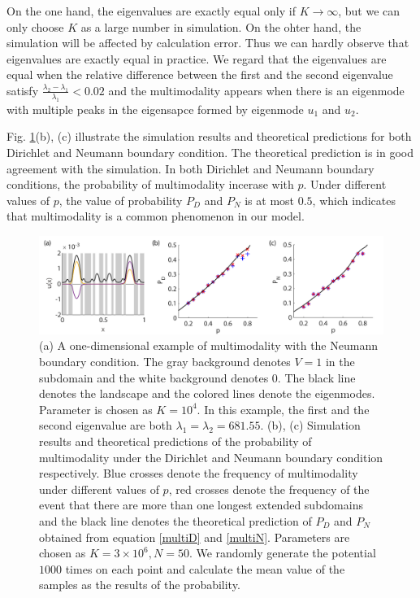 \documentclass[a4paper,11pt]{article}
\begin{document}
On the one hand, the eigenvalues are exactly equal only if $K \rightarrow \infty$, but we can only choose $K$ as a large number in simulation. On the ohter hand, the simulation will be affected by calculation error. Thus we can hardly observe that eigenvalues are exactly equal in practice. We regard that the eigenvalues are equal when the relative difference between the first and the second eigenvalue satisfy $\frac{\lambda_2 - \lambda_1}{\lambda_1} < 0.02$ and the multimodality appears when there is an eigenmode with multiple peaks in the eigensapce formed by eigenmode $u_1$ and $u_2$.

Fig. \ref{fig4}(b), (c) illustrate the simulation results and theoretical predictions for both Dirichlet and Neumann boundary condition. The theoretical prediction is in good agreement with the simulation. In both Dirichlet and Neumann boundary conditions, the probability of multimodality incerase with $p$. Under different values of $p$, the value of probability $P_D$ and $P_N$ is at most $0.5$, which indicates that multimodality is a common phenomenon in our model.

\begin{figure}
\centering
\includegraphics[width=\linewidth]{Fig4}
\caption{(a) A one-dimensional example of multimodality with the Neumann boundary condition. The gray background denotes $V = 1$ in the subdomain and the white background denotes $0$. The black line denotes the landscape and the colored lines denote the eigenmodes.  Parameter is chosen as $K = 10^4$. In this example, the first and the second eigenvalue are both $\lambda_1 = \lambda_2 = 681.55$. (b), (c) Simulation results and theoretical predictions of the probability of multimodality under the Dirichlet and Neumann boundary condition respectively. Blue crosses denote the frequency of multimodality under different values of $p$, red crosses denote the frequency of the event that there are more than one longest extended subdomains and the black line denotes the theoretical prediction of $P_D$ and $P_N$ obtained from equation \eqref{multiD} and \eqref{multiN}. Parameters are chosen as $K = 3 \times 10^6, N = 50$. We randomly generate the potential $1000$ times on each point and calculate the mean value of the samples as the results of the probability.}
\label{fig4}
\end{figure}
\end{document}
